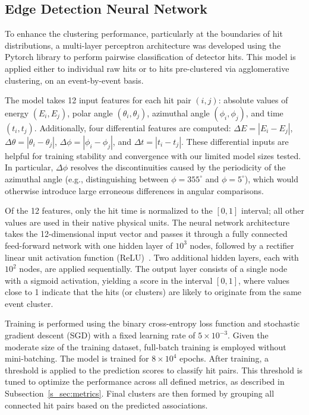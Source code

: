 \subsection{Edge Detection Neural Network}
To enhance the clustering performance, particularly at the boundaries of hit distributions, a multi-layer perceptron architecture was developed using the Pytorch library \cite{imambi2021pytorch} to perform pairwise classification of detector hits. This model is applied either to individual raw hits or to hits pre-clustered via agglomerative clustering, on an event-by-event basis.

The model takes 12 input features for each hit pair $(i, j)$: absolute values of energy $(E_i, E_j)$, polar angle $(\theta_i, \theta_j)$, azimuthal angle $(\phi_i, \phi_j)$, and time $(t_i, t_j)$. Additionally, four differential features are computed: $\Delta E = |E_i - E_j|$, $\Delta \theta = |\theta_i - \theta_j|$, $\Delta \phi = |\phi_i - \phi_j|$, and $\Delta t = |t_i - t_j|$. These differential inputs are helpful for training stability and convergence with our limited model sizes tested. In particular, $\Delta \phi$ resolves the discontinuities caused by the periodicity of the azimuthal angle (e.g., distinguishing between $\phi = 355^\circ$ and $\phi = 5^\circ$), which would otherwise introduce large erroneous differences in angular comparisons.

Of the 12 features, only the hit time is normalized to the $[0, 1]$ interval; all other values are used in their native physical units.
The neural network architecture takes the 12-dimensional input vector and passes it through a fully connected feed-forward network with one hidden layer of $10^3$ nodes, followed by a rectifier linear unit activation function (ReLU)~\cite{agarap2018deep}. Two additional hidden layers, each with $10^2$ nodes, are applied sequentially. The output layer consists of a single node with a sigmoid activation, yielding a score in the interval $[0, 1]$, where values close to 1 indicate that the hits (or clusters) are likely to originate from the same event cluster.\newline

Training is performed using the binary cross-entropy loss function \cite{mannor2005cross,de2005tutorial} and stochastic gradient descent (SGD) \cite{newton2018recent} with a fixed learning rate of $5 \times 10^{-3}$. Given the moderate size of the training dataset, full-batch training is employed without mini-batching. The model is trained for $8 \times 10^4$ epochs. After training, a threshold is applied to the prediction scores to classify hit pairs. This threshold is tuned to optimize the performance across all defined metrics, as described in Subsection~\ref{s_sec:metrics}. Final clusters are then formed by grouping all connected hit pairs based on the predicted associations.

